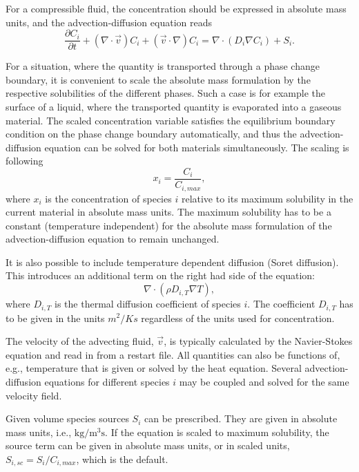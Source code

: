 For a compressible fluid, the concentration should be expressed in absolute
mass units, and the advection-diffusion equation reads
\begin{equation}
\frac{\partial C_i}{\partial t} + (\nabla\cdot\vec{v})C_i  +(\vec v\cdot\nabla) C_i = \nabla\cdot(D_i\nabla C_i) + S_i.
\end{equation}

For a situation, where the quantity is transported through a phase
change boundary, it is convenient to scale the absolute mass
formulation by the respective solubilities of the different
phases. Such a case is for example the surface of a liquid, where the
transported quantity is evaporated into a gaseous material. The
scaled concentration variable satisfies the equilibrium boundary 
condition on the phase
change boundary automatically, and thus the advection-diffusion
equation can be solved for both materials simultaneously. The scaling
is following
\begin{equation}
x_i = \frac{C_i}{C_{i,max}},
\end{equation}
where $x_i$ is the concentration of species $i$ relative to its
maximum solubility in the current material in absolute mass units. The
maximum solubility has to be a constant (temperature independent) for
the absolute mass formulation of the advection-diffusion equation to
remain unchanged.

It is also possible to include temperature dependent diffusion (Soret
diffusion). This introduces an additional term on the right had side
of the equation:
\begin{equation}
\nabla\cdot(\rho D_{i,T}\nabla T),
\end{equation}
where $D_{i,T}$ is the thermal diffusion coefficient of species
$i$. The coefficient $D_{i,T}$ has to be given in the units $m^2/Ks$
regardless of the units used for concentration.

The velocity of the advecting fluid, $\vec v$, is typically calculated by
the Navier-Stokes equation and read in from a restart file. All quantities can
also be functions of, e.g., temperature that is given or solved by the heat
equation. Several advection-diffusion equations for different species $i$ may
be coupled and solved for the same velocity field.

Given volume species sources $S_i$ can be prescribed. They are given
in absolute mass units, i.e., $\mathrm{kg}/\mathrm{m}^3\mathrm{s}$.
If the equation is scaled to maximum solubility, the source term can
be given in absolute mass units, or in scaled units, $S_{i,sc} = S_i /
C_{i,max}$, which is the default.


